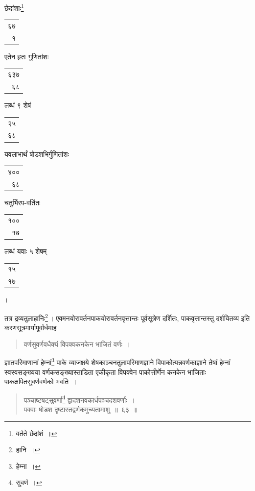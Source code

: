 \documentclass[10pt, openany]{book}
\begin{document}
{{{{छेदांशाः\renewcommand{\thefootnote}{\s ६}\footnote{\s *वर्तते छेदांशं~।}\begin{tabular}{r}६७\\१\end{tabular} एतेन हृतः गुणितांशः\begin{tabular}{r}६३७\\६८ \end{tabular}लब्धं ९ शेषं\begin{tabular}{r}२५\\६८ \end{tabular}यवलाभार्थं
षोडशभिर्गुणितांशः\begin{tabular}{r}४००\\६८ \end{tabular}चतुर्भिरप-वर्तितः\begin{tabular}{r}१००\\१७\end{tabular}लब्धं यवाः ५ शेषम्\begin{tabular}{r}१५\\१७\end{tabular}।}


{तत्र द्रव्यतुलाहानिः\renewcommand{\thefootnote}{\s ९}\footnote{\s *हानि~।}\,। एवमनयोरावर्तनपाकयोरावर्तनवृत्तान्तः
पूर्वसूत्रेण दर्शितः, पाकवृत्तान्तस्तु}
{दर्शयितव्य इति करणसूत्रमार्यापूर्वार्धमाह\textemdash}

\begin{quote}
{\bs  वर्णसुवर्णवधैक्यं विपक्वकनकेन भाजितं वर्णः~।}
\end{quote}

{ज्ञातपरिमाणानां हेम्नां\renewcommand{\thefootnote}{\s १०}\footnote{\s हेम्ना~।}  पाके व्याजक्षये
शेषकाञ्चनतुलापरिमाणज्ञाने विपाकोत्पन्नवर्णकाज्ञाने तेषां हेम्नां स्वस्वसङ्ख्यया वर्णकसङ्ख्यास्ताडिता एकीकृता
विपक्वेन पाकोत्तीर्णेन}
{कनकेन भाजिताः पाकक्षपितसुवर्णवर्णको भवति~।}

\vspace{0.3cm}{उदाहरणम्\textemdash}

\begin{quote}
    
{\eg पञ्चाष्टषट्सुवर्णा\renewcommand{\thefootnote}{\s ११}\footnote{\s *सुवर्ण~।} द्वादशनवकार्धपञ्चदशवर्णाः~।\\
 पक्वाः षोडश दृष्टास्तद्वर्णकमुच्यतामाशु~॥~६३~॥}\end{quote}

}}}
\end{document}
